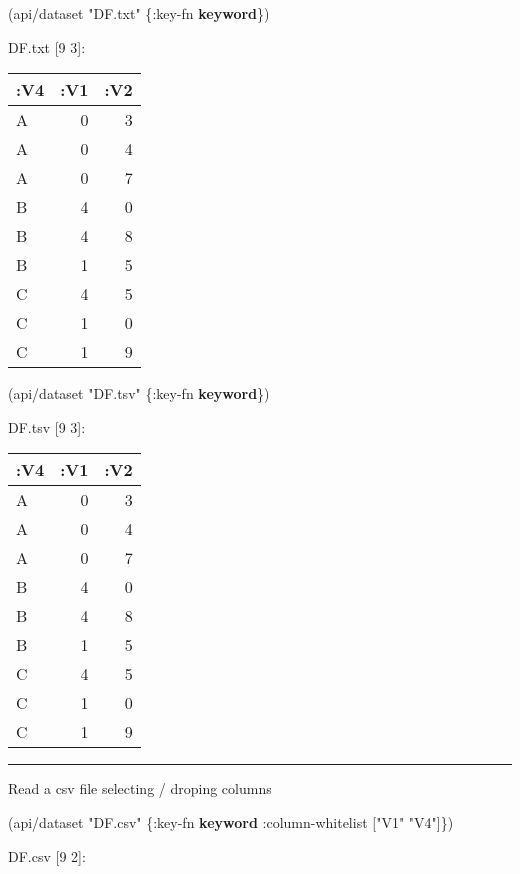 \documentclass[]{article}
\newenvironment{Shaded}{\begin{snugshade}}{\end{snugshade}}
\newcommand{\KeywordTok}[1]{\textcolor[rgb]{0.13,0.29,0.53}{\textbf{#1}}}
\newcommand{\StringTok}[1]{\textcolor[rgb]{0.31,0.60,0.02}{#1}}
\newcommand{\AttributeTok}[1]{\textcolor[rgb]{0.77,0.63,0.00}{#1}}
\newcommand{\NormalTok}[1]{#1}
\begin{document}
\begin{Shaded}
\begin{Highlighting}[]
\NormalTok{(api/dataset }\StringTok{"DF.txt"}\NormalTok{ \{}\AttributeTok{:key-fn} \KeywordTok{keyword}\NormalTok{\})}
\end{Highlighting}
\end{Shaded}

DF.txt {[}9 3{]}:

\begin{longtable}[]{@{}lrr@{}}
\toprule
:V4 & :V1 & :V2\tabularnewline
\midrule
\endhead
A & 0 & 3\tabularnewline
A & 0 & 4\tabularnewline
A & 0 & 7\tabularnewline
B & 4 & 0\tabularnewline
B & 4 & 8\tabularnewline
B & 1 & 5\tabularnewline
C & 4 & 5\tabularnewline
C & 1 & 0\tabularnewline
C & 1 & 9\tabularnewline
\bottomrule
\end{longtable}

\begin{Shaded}
\begin{Highlighting}[]
\NormalTok{(api/dataset }\StringTok{"DF.tsv"}\NormalTok{ \{}\AttributeTok{:key-fn} \KeywordTok{keyword}\NormalTok{\})}
\end{Highlighting}
\end{Shaded}

DF.tsv {[}9 3{]}:

\begin{longtable}[]{@{}lrr@{}}
\toprule
:V4 & :V1 & :V2\tabularnewline
\midrule
\endhead
A & 0 & 3\tabularnewline
A & 0 & 4\tabularnewline
A & 0 & 7\tabularnewline
B & 4 & 0\tabularnewline
B & 4 & 8\tabularnewline
B & 1 & 5\tabularnewline
C & 4 & 5\tabularnewline
C & 1 & 0\tabularnewline
C & 1 & 9\tabularnewline
\bottomrule
\end{longtable}

\begin{center}\rule{0.5\linewidth}{0.5pt}\end{center}

Read a csv file selecting / droping columns

\begin{Shaded}
\begin{Highlighting}[]
\NormalTok{(api/dataset }\StringTok{"DF.csv"}\NormalTok{ \{}\AttributeTok{:key-fn} \KeywordTok{keyword}
                       \AttributeTok{:column-whitelist}\NormalTok{ [}\StringTok{"V1"} \StringTok{"V4"}\NormalTok{]\})}
\end{Highlighting}
\end{Shaded}

DF.csv {[}9 2{]}:
\end{document}
